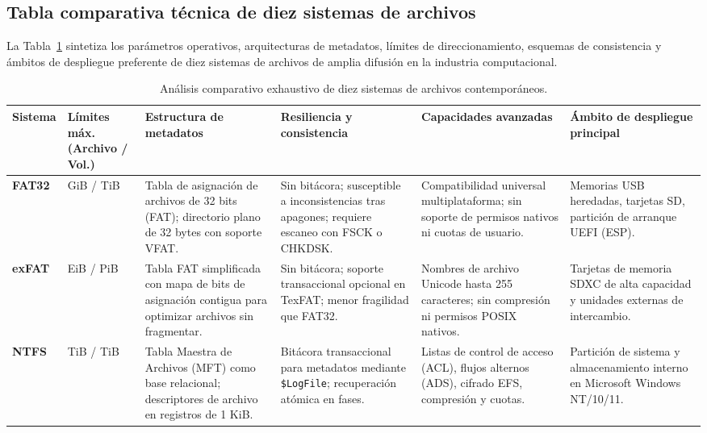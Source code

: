 \documentclass[12pt]{article}
\begin{document}
\subsection{Tabla comparativa técnica de diez sistemas de archivos}
\label{subsec:tablaComparativaDiezSistemasArchivos}

La Tabla~\ref{tab:comparativaDiezSistemasArchivos} sintetiza los parámetros operativos, arquitecturas de metadatos, límites de direccionamiento, esquemas de consistencia y ámbitos de despliegue preferente de diez sistemas de archivos de amplia difusión en la industria computacional.

\begin{table}[!htbp]
\centering
\scriptsize
\renewcommand{\arraystretch}{1.1}
\renewcommand{\tabularxcolumn}[1]{m{#1}}
\setlength{\emergencystretch}{1.5em}
\caption{Análisis comparativo exhaustivo de diez sistemas de archivos contemporáneos.}
\label{tab:comparativaDiezSistemasArchivos}
\begin{tabularx}{\textwidth}{>{\centering\arraybackslash}m{1.3cm} >{\centering\arraybackslash}m{1.9cm} X X X X}
\toprule
\textbf{Sistema} & \textbf{Límites máx. (Archivo / Vol.)} & \textbf{Estructura de metadatos} & \textbf{Resiliencia y consistencia} & \textbf{Capacidades avanzadas} & \textbf{Ámbito de despliegue principal} \\
\midrule
\textbf{FAT32} & 4 GiB / \newline 2 TiB & Tabla de asignación de archivos de 32 bits (FAT); directorio plano de 32 bytes con soporte VFAT. & Sin bitácora; susceptible a inconsistencias tras apagones; requiere escaneo con FSCK o CHKDSK. & Compatibilidad universal multiplataforma; sin soporte de permisos nativos ni cuotas de usuario. & Memorias USB heredadas, tarjetas SD, partición de arranque UEFI (ESP). \\
\addlinespace
\textbf{exFAT} & 16 EiB / \newline 128 PiB & Tabla FAT simplificada con mapa de bits de asignación contigua para optimizar archivos sin fragmentar. & Sin bitácora; soporte transaccional opcional en TexFAT; menor fragilidad que FAT32. & Nombres de archivo Unicode hasta 255 caracteres; sin compresión ni permisos POSIX nativos. & Tarjetas de memoria SDXC de alta capacidad y unidades externas de intercambio. \\
\addlinespace
\textbf{NTFS} & 16 TiB / \newline 256 TiB & Tabla Maestra de Archivos (MFT) como base relacional; descriptores de archivo en registros de 1 KiB. & Bitácora transaccional para metadatos mediante \texttt{\$LogFile}; recuperación atómica en fases. & Listas de control de acceso (ACL), flujos alternos (ADS), cifrado EFS, compresión y cuotas. & Partición de sistema y almacenamiento interno en Microsoft Windows NT/10/11. \\

\end{tabularx}
\end{table}
\end{document}
